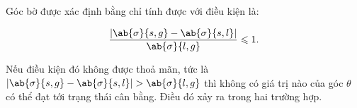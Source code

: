 \noindent


Góc bờ được xác định bằng  chỉ tính được với điều kiện là:

\begin{equation}\label{eq:14_7}
	\frac{|\ab{\sigma}{s,g} - \ab{\sigma}{s,l}|}{\ab{\sigma}{l,g}} \leqslant 1.
\end{equation}

\noindent


Nếu điều kiện đó không được thoả mãn, tức là $|\ab{\sigma}{s,g} - \ab{\sigma}{s,l}|>\ab{\sigma}{l,g}$ thì không có giá trị nào của góc $\theta$ có thể đạt tới trạng thái cân bằng. Điều đó xảy ra trong hai trường hợp.

